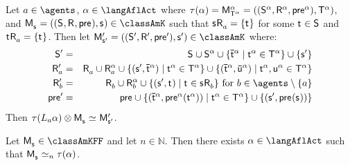 \begin{lemma}\label{afl-kff-construction-learning}
    Let $\agentA \in \agents$, $\alpha \in \langAflAct$ where $\tau(\alpha) = \aPModel[\alpha]{\aStatesT[\alpha]} = \aPModelTuple[\alpha]{\aStatesT[\alpha]}$, and $\aPModel{\aStateS} = \aPModelTuple{\aStateS} \in \classAmK$ such that $\aStateS \aAccessibility{\agentA} = \{\aStateT\}$ for some $\aStateT \in \aStates$ and $\aStateT \aAccessibility{\agentA} = \{\aStateT\}$.
    Then let $\aPModel[\prime]{\aStateS[\prime]} = \aPModelTuple[\prime]{\aStateS[\prime]} \in \classAmK$ where:
    \begin{eqnarray*}
        \aStates[\prime] &=& \aStates \cup \aStates[\alpha] \cup \{\aPStateT[\alpha] \mid \aStateT[\alpha] \in \aStatesT[\alpha]\} \cup \{\aStateS[\prime]\}\\
        \aAccessibility[\prime]{\agentA} &=& \aAccessibility{\agentA} \cup \aAccessibility[\alpha]{\agentA} \cup \{(\aStateS[\prime], \aPStateT[\alpha]) \mid \aStateT[\alpha] \in \aStatesT[\alpha]\} \cup \{(\aPStateT[\alpha], \aPStateU[\alpha]) \mid \aStateT[\alpha], \aStateU[\alpha] \in \aStatesT[\alpha]\}\\
        \aAccessibility[\prime]{\agentB} &=& \aAccessibility{\agentB} \cup \aAccessibility[\alpha]{\agentB} \cup \{(\aStateS[\prime], \aStateT) \mid \aStateT \in \aStateS \aAccessibility{\agentB}\} \text{ for } \agentB \in \agents \setminus \{\agentA\}\\
        \aPrecondition[\prime] &=& \aPrecondition \cup \{(\aPStateT[\alpha], \aPrecondition[\alpha](\aStateT[\alpha])) \mid \aStateT[\alpha] \in \aStatesT[\alpha]\} \cup \{(\aStateS[\prime], \aPrecondition(\aStateS))\}
    \end{eqnarray*}
    Then $\tau(\learns_\agentA \alpha) \exec \aPModel{\aStateS} \bisimilar \aPModel[\prime]{\aStateS[\prime]}$.
\end{lemma}

\begin{proposition}\label{afl-kff-correspondence}
    Let $\aPModel{\aStateS} \in \classAmKFF$ and let $n \in \mathbb{N}$. 
    Then there exists $\alpha \in \langAflAct$ such that $\aPModel{\aStateS} \bisimilar[n] \tau(\alpha)$.
\end{proposition}

